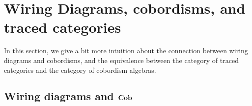 \documentclass[12pt,oneside,article,draft]{memoir}
\begin{document}
%
%
%
%
%
\section{Wiring Diagrams, cobordisms, and traced categories}

In this section, we give a bit more intuition about the connection between wiring diagrams and cobordisms, and the equivalence between the category of traced categories
and the category of cobordism algebras.

\subsection{Wiring diagrams and $\mathbf{Cob}$}\label{sec:wds_and_cob}
\end{document}
